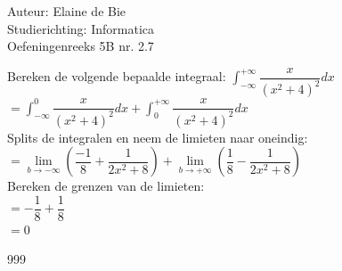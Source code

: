 \documentclass[a4paper]{article}
\begin{document}
  
  
\noindent \large Auteur: Elaine de Bie \\
\noindent \large Studierichting:  Informatica\\
\noindent \large Oefeningenreeks 5B nr. 2.7\\


\medskip


\normalsize


Bereken de volgende bepaalde integraal:
$ \displaystyle \int_{-\infty}^{+\infty} \dfrac{x}{\left(x^2 + 4\right)^2}  dx $\\

$ = \displaystyle \int_{-\infty}^{0} \dfrac{x}{\left(x^2 + 4\right)^2}  dx + \displaystyle \int_{0}^{+\infty} \dfrac{x}{\left(x^2 + 4\right)^2}  dx $ \\

Splits de integralen en neem de limieten naar oneindig: \\

$= \lim\limits_{b\rightarrow -\infty} \left(\dfrac{-1}{8} + \dfrac{1}{2x^2 + 8}\right) + \lim\limits_{b\rightarrow + \infty}\left(\dfrac{1}{8} - \dfrac{1}{2x^2 + 8}\right) $\\


Bereken de grenzen van de limieten: \\

$ = - \dfrac{1}{8} + \dfrac{1}{8} $ \\

$ = 0 $\\





\begin{thebibliography}{999}
\end{thebibliography}
\end{document}
